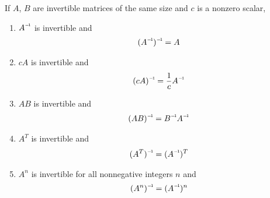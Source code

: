 \begin{theorem} 
	If $A$, $B$ are invertible matrices of the same size and $c$ is a nonzero scalar,
	\begin{enumerate}
		\item $\inv{A}$ is invertible and \begin{align*}
		\inv{(\inv{A})} = A
		\end{align*}
		\item $cA$ is invertible and \begin{align*}
		\inv{(cA)} = \frac{1}{c}\inv{A}
		\end{align*}
		\item $AB$ is invertible and \begin{align*}
		\inv{(AB)} = \inv{B}\inv{A}
		\end{align*}
		\item $A^T$ is invertible and \begin{align*}
		\inv{(A^T)} = (\inv{A})^{T}
		\end{align*}
		\item $A^n$ is invertible for all nonnegative integers $n$ and \begin{align*}
		\inv{(A^n)} = (\inv{A})^n
		\end{align*}
	\end{enumerate}
\end{theorem}


